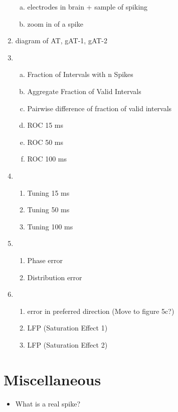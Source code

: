 \documentclass[]{article}
\begin{document}
\begin{enumerate}
\begin{enumerate}[(a)]
\item electrodes in brain + sample of spiking
\item zoom in of a spike
\end{enumerate}
\item diagram of AT, gAT-1, gAT-2
\item
\begin{enumerate}[(a)]
\item Fraction of Intervals with n Spikes
\item Aggregate Fraction of Valid Intervals
\item Pairwise difference of fraction of valid intervals
\item ROC 15 ms
\item ROC 50 ms
\item ROC 100 ms
\end{enumerate}
\item
\begin{enumerate}
\item Tuning 15 ms
\item Tuning 50 ms
\item Tuning 100 ms
\end{enumerate}
\item
\begin{enumerate}
\item Phase error
\item Distribution error
\end{enumerate}
\item
\begin{enumerate}
\item error in preferred direction (Move to figure 5c?)
\item LFP (Saturation Effect 1)
\item LFP (Saturation Effect 2)
\end{enumerate}
\end{enumerate}

\section*{Miscellaneous}
\begin{itemize}
\item What is a real spike?
\end{itemize}
\end{document}
